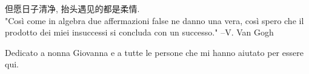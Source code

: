 
\cleardoublepage
{}
\thispagestyle{empty}

\vspace*{3cm}

\begin{center}
    但愿日子清净, 抬头遇见的都是柔情.\\ \medskip
    "Così come in algebra due affermazioni false ne danno una vera, così spero che il prodotto dei miei insuccessi si concluda con un successo." \medskip
    --V. Van Gogh
\end{center}

\medskip

\begin{center}
Dedicato a nonna Giovanna e a tutte le persone che mi hanno aiutato per essere qui.
\end{center}
